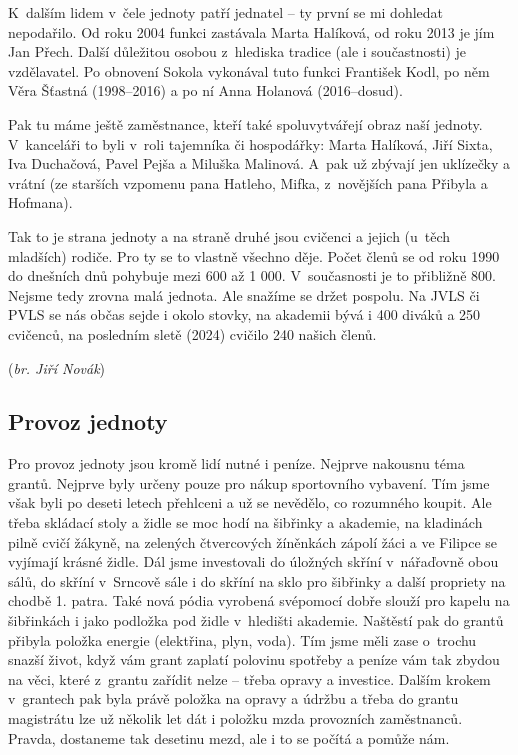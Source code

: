 \documentclass[a5paper, 11pt, twoside]{article}
\begin{document}
K~dalším lidem v~čele jednoty patří jednatel -- ty první se mi dohledat
nepodařilo. Od roku 2004 funkci zastávala Marta Halíková, od roku 2013
je jím Jan Přech. Další důležitou osobou z~hlediska tradice (ale i
součastnosti) je vzdělavatel. Po obnovení Sokola vykonával tuto funkci
František Kodl, po něm Věra Šťastná (1998--2016) a po ní Anna Holanová
(2016--dosud).

Pak tu máme ještě zaměstnance, kteří také spoluvytvářejí obraz naší
jednoty. V~kanceláři to byli v~roli tajemníka či hospodářky: Marta
Halíková, Jiří Sixta, Iva Duchačová, Pavel Pejša a Miluška Malinová.
A~pak už zbývají jen uklízečky a vrátní (ze starších vzpomenu pana
Hatleho, Mifka, z~novějších pana Přibyla a Hofmana).

Tak to je strana jednoty a na straně druhé jsou cvičenci a jejich
(u~těch mladších) rodiče. Pro ty se to vlastně všechno děje. Počet členů se
od roku 1990 do dnešních dnů pohybuje mezi 600 až 1 000. V~současnosti
je to přibližně 800. Nejsme tedy zrovna malá jednota. Ale snažíme se
držet pospolu. Na JVLS či PVLS se nás občas sejde i okolo stovky, na
akademii bývá i 400 diváků a 250 cvičenců, na posledním sletě (2024)
cvičilo 240 našich členů.

\hfill(\textit{br. Jiří Novák})

\subsection{Provoz jednoty}

Pro provoz jednoty jsou kromě lidí nutné i peníze. Nejprve nakousnu téma
grantů. Nejprve byly určeny pouze pro nákup sportovního vybavení. Tím
jsme však byli po deseti letech přehlceni a už se nevědělo, co rozumného
koupit. Ale třeba skládací stoly a židle se moc hodí na šibřinky a
akademie, na kladinách pilně cvičí žákyně, na zelených čtvercových
žíněnkách zápolí žáci a ve Filipce se vyjímají krásné židle. Dál jsme
investovali do úložných skříní v~nářaďovně obou sálů, do skříní
v~Srncově sále i do skříní na sklo pro šibřinky a další propriety na
chodbě 1. patra. Také nová pódia vyrobená svépomocí dobře slouží pro
kapelu na šibřinkách i jako podložka pod židle v~hledišti akademie.
Naštěstí pak do grantů přibyla položka energie (elektřina, plyn, voda).
Tím jsme měli zase o~trochu snazší život, když vám grant zaplatí
polovinu spotřeby a peníze vám tak zbydou na věci, které z~grantu
zařídit nelze -- třeba opravy a investice. Dalším krokem v~grantech pak
byla právě položka na opravy a údržbu a třeba do grantu magistrátu lze
už několik let dát i položku mzda provozních zaměstnanců. Pravda,
dostaneme tak desetinu mezd, ale i to se počítá a pomůže nám.
\end{document}
